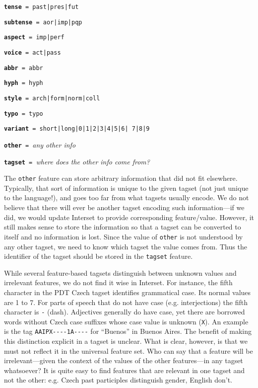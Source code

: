\documentclass[11pt]{article}
\newcommand{\XXX}{\textcolor{red}{XXX }} %
\begin{document}
\begin{compactitem}
\item \texttt{\textbf{tense} = past|pres|fut}
\item \texttt{\textbf{subtense} = aor|imp|pqp}
\item \texttt{\textbf{aspect} = imp|perf}
\item \texttt{\textbf{voice} = act|pass}
\item \texttt{\textbf{abbr} = abbr}
\item \texttt{\textbf{hyph} = hyph}
\item \texttt{\textbf{style} = arch|form|norm|coll}
\item \texttt{\textbf{typo} = typo}
\item \texttt{\textbf{variant} = short|long|0|1|2|3|4|5|6| 7|8|9}
\item \texttt{\textbf{other} = }\textit{any other info}
\item \texttt{\textbf{tagset} = }\textit{where does the other info come from?}
\end{compactitem}

The \texttt{other} feature can store arbitrary information that did not fit elsewhere. Typically, that sort of information is unique to the given tagset (not just unique to the language!), and goes too far from what tagsets usually encode. We do not believe that there will ever be another tagset encoding such information---if we did, we would update Interset to provide corresponding feature/value. However, it still makes sense to store the information so that a tagset can be converted to itself and no information is lost. Since the value of \texttt{other} is not understood by any other tagset, we need to know which tagset the value comes from. Thus the identifier of the tagset should be stored in the \texttt{tagset} feature.

While several feature-based tagsets distinguish between unknown values and irrelevant features, we do not find it wise in Interset. For instance, the fifth character in the PDT Czech tagset identifies grammatical case. Its normal values are 1 to 7. For parts of speech that do not have case (e.g. interjections) the fifth character is \texttt{-} (dash). Adjectives generally do have case, yet there are borrowed words without Czech case suffixes whose case value is unknown (\texttt{X}). An example is the tag \texttt{AAIPX-{}-{}-{}-1A-{}-{}-{}-} for “Buenos” in Buenos Aires. The benefit of making this distinction explicit in a tagset is unclear. What is clear, however, is that we must not reflect it in the universal feature set. Who can say that a feature will be irrelevant—given the context of the values of the other features—in any tagset whatsoever? It is quite easy to find features that are relevant in one tagset and not the other: e.g. Czech past participles distinguish gender, English don’t.
\end{document}

